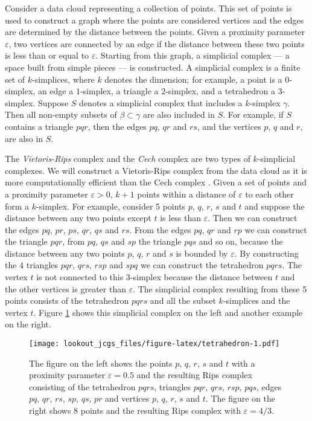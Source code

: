 \documentclass[12pt]{article}
\theoremstyle{definition}
\theoremstyle{definition}
\theoremstyle{definition}
\theoremstyle{remark}
\begin{document}
Consider a data cloud representing a collection of points. This set of points is used to construct a graph where the points are considered vertices and the edges are determined by the distance between the points. Given a proximity parameter \(\varepsilon\), two vertices are connected by an edge if the distance between these two points is less than or equal to \(\varepsilon\). Starting from this graph, a simplicial complex --- a space built from simple pieces --- is constructed. A simplicial complex is a finite set of \(k\)-simplices, where \(k\) denotes the dimension; for example, a point is a \(0\)-simplex, an edge a \(1\)-simplex, a triangle a \(2\)-simplex, and a tetrahedron a \(3\)-simplex. Suppose \(S\) denotes a simplicial complex that includes a \(k\)-simplex \(\gamma\). Then all non-empty subsets of \(\beta \subset \gamma\) are also included in \(S\). For example, if \(S\) contains a triangle \(pqr\), then the edges \(pq\), \(qr\) and \(rs\), and the vertices \(p\), \(q\) and \(r\), are also in \(S\).

The \emph{Vietoris-Rips} complex and the \emph{Cech} complex are two types of \(k\)-simplicial complexes. We will construct a Vietoris-Rips complex from the data cloud as it is more computationally efficient than the Cech complex \citep{ghrist2008barcodes}. Given a set of points and a proximity parameter \(\varepsilon > 0\), \(k+1\) points within a distance of \(\varepsilon\) to each other form a \(k\)-simplex. For example, consider 5 points \(p\), \(q\), \(r\), \(s\) and \(t\) and suppose the distance between any two points except \(t\) is less than \(\varepsilon\). Then we can construct the edges \(pq\), \(pr\), \(ps\), \(qr\), \(qs\) and \(rs\). From the edges \(pq\), \(qr\) and \(rp\) we can construct the triangle \(pqr\), from \(pq\), \(qs\) and \(sp\) the triangle \(pqs\) and so on, because the distance between any two points \(p\), \(q\), \(r\) and \(s\) is bounded by \(\varepsilon\). By constructing the \(4\) triangles \(pqr\), \(qrs\), \(rsp\) and \(spq\) we can construct the tetrahedron \(pqrs\). The vertex \(t\) is not connected to this \(3\)-simplex because the distance between \(t\) and the other vertices is greater than \(\varepsilon\). The simplicial complex resulting from these 5 points consists of the tetrahedron \(pqrs\) and all the subset \(k\)-simplices and the vertex \(t\). Figure \ref{fig:tetrahedron} shows this simplicial complex on the left and another example on the right.

\begin{figure}
\centering
\texttt{[image: lookout\_jcgs\_files/figure-latex/tetrahedron-1.pdf]}
\caption{\label{fig:tetrahedron}The figure on the left shows the points \(p\), \(q\), \(r\), \(s\) and \(t\) with a proximity parameter \(\varepsilon = 0.5\) and the resulting Rips complex consisting of the tetrahedron \(pqrs\), triangles \(pqr\), \(qrs\), \(rsp\), \(pqs\), edges \(pq\), \(qr\), \(rs\), \(sp\), \(qs\), \(pr\) and vertices \(p\), \(q\), \(r\), \(s\) and \(t\). The figure on the right shows \(8\) points and the resulting Rips complex with \(\varepsilon=4/3\).}
\end{figure}
\end{document}
